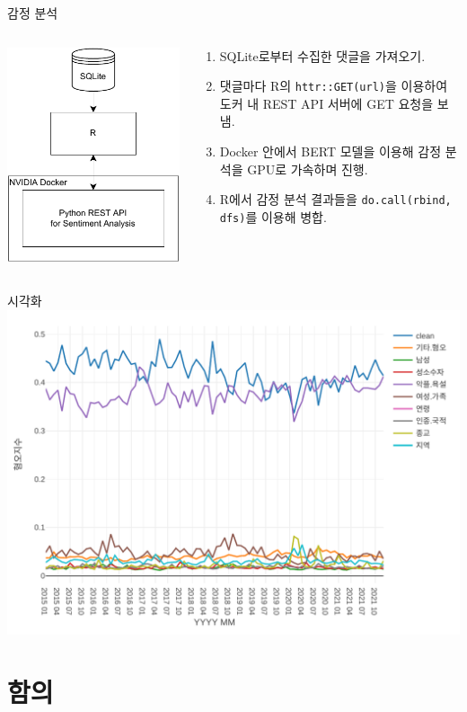 \documentclass[mathserif, aspectratio=169]{beamer}
\begin{document}
\begin{frame}{감정 분석}
    \begin{columns}
        \begin{column}{0.3\linewidth}
            \centering
            \includegraphics[width = 0.8\linewidth]{images/sentiment_analysis.pdf}
        \end{column}
        \begin{column}{0.7\linewidth}
            \begin{enumerate}
                \item SQLite로부터 수집한 댓글을 가져오기.
                \item 댓글마다 R의 \texttt{httr::GET(url)}을 이용하여 도커 내 REST API 서버에 GET 요청을 보냄.
                \item Docker 안에서 BERT 모델을 이용해 감정 분석을 GPU로 가속하며 진행.
                \item R에서 감정 분석 결과들을 \texttt{do.call(rbind, dfs)}를 이용해 병합.
            \end{enumerate}
        \end{column}
    \end{columns}
\end{frame}
\begin{frame}{시각화}
    \centering
    \includegraphics[width = 0.6\linewidth]{images/lineplot.pdf}
\end{frame}
\section{함의}
\end{document}
